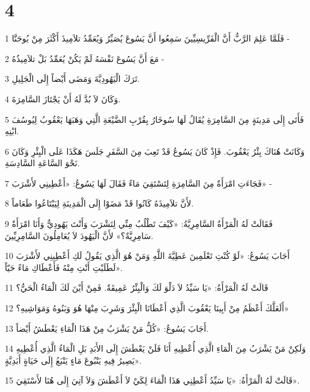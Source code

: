 \chapter{4}

\par 1 فَلَمَّا عَلِمَ الرَّبُّ أَنَّ الْفَرِّيسِيِّينَ سَمِعُوا أَنَّ يَسُوعَ يُصَيِّرُ وَيُعَمِّدُ تلاَمِيذَ أَكْثَرَ مِنْ يُوحَنَّا -
\par 2 مَعَ أَنَّ يَسُوعَ نَفْسَهُ لَمْ يَكُنْ يُعَمِّدُ بَلْ تلاَمِيذُهُ -
\par 3 تَرَكَ الْيَهُودِيَّةَ وَمَضَى أَيْضاً إِلَى الْجَلِيلِ.
\par 4 وَكَانَ لاَ بُدَّ لَهُ أَنْ يَجْتَازَ السَّامِرَةَ.
\par 5 فَأَتَى إِلَى مَدِينَةٍ مِنَ السَّامِرَةِ يُقَالُ لَهَا سُوخَارُ بِقُرْبِ الضَّيْعَةِ الَّتِي وَهَبَهَا يَعْقُوبُ لِيُوسُفَ ابْنِهِ.
\par 6 وَكَانَتْ هُنَاكَ بِئْرُ يَعْقُوبَ. فَإِذْ كَانَ يَسُوعُ قَدْ تَعِبَ مِنَ السَّفَرِ جَلَسَ هَكَذَا عَلَى الْبِئْرِ وَكَانَ نَحْوَ السَّاعَةِ السَّادِسَةِ.
\par 7 فَجَاءَتِ امْرَأَةٌ مِنَ السَّامِرَةِ لِتَسْتَقِيَ مَاءً فَقَالَ لَهَا يَسُوعُ: «أَعْطِينِي لأَشْرَبَ» -
\par 8 لأَنَّ تلاَمِيذَهُ كَانُوا قَدْ مَضَوْا إِلَى الْمَدِينَةِ لِيَبْتَاعُوا طَعَاماً.
\par 9 فَقَالَتْ لَهُ الْمَرْأَةُ السَّامِرِيَّةُ: «كَيْفَ تَطْلُبُ مِنِّي لِتَشْرَبَ وَأَنْتَ يَهُودِيٌّ وَأَنَا امْرَأَةٌ سَامِرِيَّةٌ؟» لأَنَّ الْيَهُودَ لاَ يُعَامِلُونَ السَّامِرِيِّينَ.
\par 10 أَجَابَ يَسُوعُ: «لَوْ كُنْتِ تَعْلَمِينَ عَطِيَّةَ اللَّهِ وَمَنْ هُوَ الَّذِي يَقُولُ لَكِ أَعْطِينِي لأَشْرَبَ لَطَلَبْتِ أَنْتِ مِنْهُ فَأَعْطَاكِ مَاءً حَيّاً».
\par 11 قَالَتْ لَهُ الْمَرْأَةُ: «يَا سَيِّدُ لاَ دَلْوَ لَكَ وَالْبِئْرُ عَمِيقَةٌ. فَمِنْ أَيْنَ لَكَ الْمَاءُ الْحَيُّ؟
\par 12 أَلَعَلَّكَ أَعْظَمُ مِنْ أَبِينَا يَعْقُوبَ الَّذِي أَعْطَانَا الْبِئْرَ وَشَرِبَ مِنْهَا هُوَ وَبَنُوهُ وَمَوَاشِيهِ؟»
\par 13 أَجَابَ يَسُوعُ: «كُلُّ مَنْ يَشْرَبُ مِنْ هَذَا الْمَاءِ يَعْطَشُ أَيْضاً.
\par 14 وَلَكِنْ مَنْ يَشْرَبُ مِنَ الْمَاءِ الَّذِي أُعْطِيهِ أَنَا فَلَنْ يَعْطَشَ إِلَى الأَبَدِ بَلِ الْمَاءُ الَّذِي أُعْطِيهِ يَصِيرُ فِيهِ يَنْبُوعَ مَاءٍ يَنْبَعُ إِلَى حَيَاةٍ أَبَدِيَّةٍ».
\par 15 قَالَتْ لَهُ الْمَرْأَةُ: «يَا سَيِّدُ أَعْطِنِي هَذَا الْمَاءَ لِكَيْ لاَ أَعْطَشَ وَلاَ آتِيَ إِلَى هُنَا لأَسْتَقِيَ».
